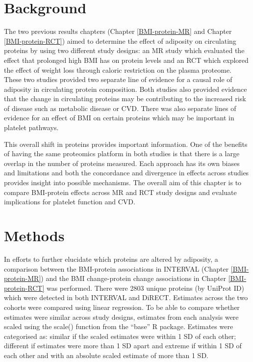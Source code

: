 \documentclass[11pt,twoside]{bristolthesis}
\begin{document}
\hypertarget{background-5}{%
\section{Background}\label{background-5}}

The two previous results chapters (Chapter \ref{BMI-protein-MR} and Chapter \ref{BMI-protein-RCT}) aimed to determine the effect of adiposity on circulating proteins by using two different study designs: an MR study which evaluated the effect that prolonged high BMI has on protein levels and an RCT which explored the effect of weight loss through caloric restriction on the plasma proteome. These two studies provided two separate line of evidence for a causal role of adiposity in circulating protein composition. Both studies also provided evidence that the change in circulating proteins may be contributing to the increased risk of disease such as metabolic disease or CVD. There was also separate lines of evidence for an effect of BMI on certain proteins which may be important in platelet pathways.

This overall shift in proteins provides important information. One of the benefits of having the same proteomics platform in both studies is that there is a large overlap in the number of proteins measured. Each approach has its own biases and limitations and both the concordance and divergence in effects across studies provides insight into possible mechanisms. The overall aim of this chapter is to compare BMI-protein effects across MR and RCT study designs and evaluate implications for platelet function and CVD.

\hypertarget{methods-4}{%
\section{Methods}\label{methods-4}}

In efforts to further elucidate which proteins are altered by adiposity, a comparison between the BMI-protein associations in INTERVAL (Chapter \ref{BMI-protein-MR}) and the BMI change-protein change associations in Chapter \ref{BMI-protein-RCT} was performed. There were 2803 unique proteins (by UniProt ID) which were detected in both INTERVAL and DiRECT. Estimates across the two cohorts were compared using linear regression. To be able to compare whether estimates were similar across study designs, estimates from each analysis were scaled using the scale() function from the ``base'' R package. Estimates were categorised as: similar if the scaled estimates were within 1 SD of each other; different if estimates were more than 1 SD apart and extreme if within 1 SD of each other and with an absolute scaled estimate of more than 1 SD.
\end{document}
